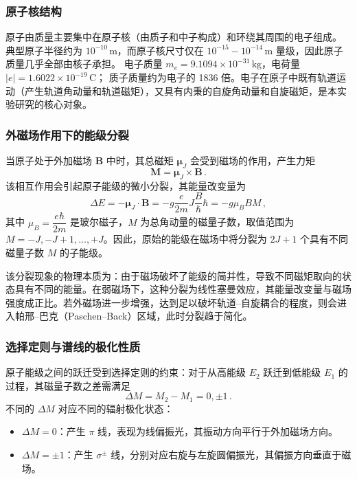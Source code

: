 \documentclass[12pt,a4paper,UTF8]{ctexart}
\begin{document}
\subsubsection*{原子核结构}
原子由质量主要集中在原子核（由质子和中子构成）和环绕其周围的电子组成。
典型原子半径约为 \(10^{-10}\)\,m，而原子核尺寸仅在 \(10^{-15}\!-\!10^{-14}\)\,m 量级，因此原子质量几乎全部由核子承担。
电子质量 \(m_e = 9.1094\times10^{-31}\,\mathrm{kg}\)，电荷量 \(\lvert e\rvert = 1.6022\times10^{-19}\,\mathrm{C}\)；
质子质量约为电子的 1836 倍。电子在原子中既有轨道运动（产生轨道角动量和轨道磁矩），又具有内秉的自旋角动量和自旋磁矩，是本实验研究的核心对象。

\subsubsection{外磁场作用下的能级分裂}

当原子处于外加磁场 $\mathbf{B}$ 中时，其总磁矩 $\boldsymbol{\mu}_J$ 会受到磁场的作用，产生力矩
\[
\mathbf{M} = \boldsymbol{\mu}_J \times \mathbf{B} \,.
\]
该相互作用会引起原子能级的微小分裂，其能量改变量为
\[
\Delta E = -\boldsymbol{\mu}_J \cdot \mathbf{B} = -g\frac{e}{2m}J\frac{B}{\hbar}\hbar = -g\mu_B B M \,,
\]
其中 $\mu_B = \dfrac{e\hbar}{2m}$ 是玻尔磁子，$M$ 为总角动量的磁量子数，取值范围为 $M = -J, -J+1, \dots, +J$。因此，原始的能级在磁场中将分裂为 $2J + 1$ 个具有不同磁量子数 $M$ 的子能级。

该分裂现象的物理本质为：由于磁场破坏了能级的简并性，导致不同磁矩取向的状态具有不同的能量。在弱磁场下，这种分裂为线性塞曼效应，其能量改变量与磁场强度成正比。若外磁场进一步增强，达到足以破坏轨道–自旋耦合的程度，则会进入帕邢–巴克（Paschen--Back）区域，此时分裂趋于简化。

\subsubsection{选择定则与谱线的极化性质}

原子能级之间的跃迁受到选择定则的约束：对于从高能级 $E_2$ 跃迁到低能级 $E_1$ 的过程，其磁量子数之差需满足
\[
\Delta M = M_2 - M_1 = 0, \pm 1 \,.
\]
不同的 $\Delta M$ 对应不同的辐射极化状态：

\begin{itemize}
  \item $\Delta M = 0$：产生 $\pi$ 线，表现为线偏振光，其振动方向平行于外加磁场方向。
  \item $\Delta M = \pm 1$：产生 $\sigma^\pm$ 线，分别对应右旋与左旋圆偏振光，其偏振方向垂直于磁场。
\end{itemize}
\end{document}
